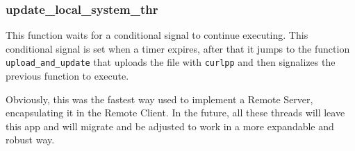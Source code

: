 \subsubsection{update\_local\_system\_thr}
This function waits for a conditional signal to continue executing. This conditional signal is set when a timer expires, after that it jumps to the function \texttt{upload\_and\_update} that uploads the file with \texttt{curlpp} and then signalizes the previous function to execute.
%
%

Obviously, this was the fastest way used to implement a Remote Server, encapsulating it in the Remote Client. In the future, all these threads will leave this app and will migrate and be adjusted to work in a more expandable and robust way.